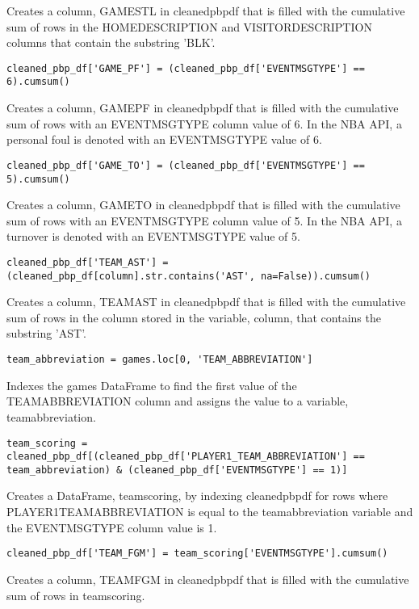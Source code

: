 \documentclass{article}
\begin{document}
Creates a column, GAME\textunderscore STL in cleaned\textunderscore pbp\textunderscore df that is filled with the cumulative sum of rows in the HOMEDESCRIPTION and VISITORDESCRIPTION columns that contain the substring 'BLK'.
\begin{lstlisting}
cleaned_pbp_df['GAME_PF'] = (cleaned_pbp_df['EVENTMSGTYPE'] == 6).cumsum()
\end{lstlisting}
Creates a column, GAME\textunderscore PF in cleaned\textunderscore pbp\textunderscore df that is filled with the cumulative sum of rows with an EVENTMSGTYPE column value of 6. In the NBA API, a personal foul is denoted with an EVENTMSGTYPE value of 6.
\begin{lstlisting}
cleaned_pbp_df['GAME_TO'] = (cleaned_pbp_df['EVENTMSGTYPE'] == 5).cumsum()
\end{lstlisting}
Creates a column, GAME\textunderscore TO in cleaned\textunderscore pbp\textunderscore df that is filled with the cumulative sum of rows with an EVENTMSGTYPE column value of 5. In the NBA API, a turnover is denoted with an EVENTMSGTYPE value of 5.
\begin{lstlisting}
cleaned_pbp_df['TEAM_AST'] = (cleaned_pbp_df[column].str.contains('AST', na=False)).cumsum()
\end{lstlisting}
Creates a column, TEAM\textunderscore AST in cleaned\textunderscore pbp\textunderscore df that is filled with the cumulative sum of rows in the column stored in the variable, column, that contains the substring 'AST'.
\begin{lstlisting}
team_abbreviation = games.loc[0, 'TEAM_ABBREVIATION']
\end{lstlisting}
Indexes the games DataFrame to find the first value of the TEAM\textunderscore ABBREVIATION column and assigns the value to a variable, team\textunderscore abbreviation.
\begin{lstlisting}
team_scoring = cleaned_pbp_df[(cleaned_pbp_df['PLAYER1_TEAM_ABBREVIATION'] == team_abbreviation) & (cleaned_pbp_df['EVENTMSGTYPE'] == 1)]
\end{lstlisting}
Creates a DataFrame, team\textunderscore scoring, by indexing cleaned\textunderscore pbp\textunderscore df for rows where PLAYER1\textunderscore TEAM\textunderscore ABBREVIATION is equal to the team\textunderscore abbreviation variable and the EVENTMSGTYPE column value is 1.
\begin{lstlisting}
cleaned_pbp_df['TEAM_FGM'] = team_scoring['EVENTMSGTYPE'].cumsum()
\end{lstlisting}
Creates a column, TEAM\textunderscore FGM in cleaned\textunderscore pbp\textunderscore df that is filled with the cumulative sum of rows in team\textunderscore scoring.
\end{document}
